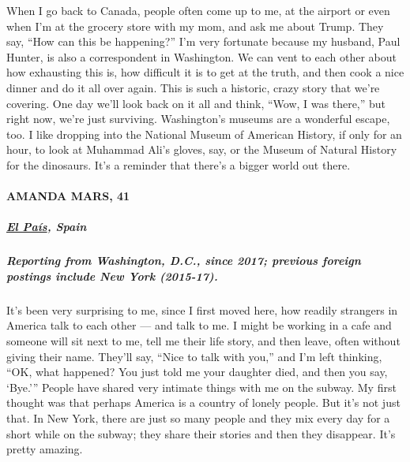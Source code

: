 When I go back to Canada, people often come up to me, at the airport or
even when I'm at the grocery store with my mom, and ask me about Trump.
They say, ``How can this be happening?'' I'm very fortunate because my
husband, Paul Hunter, is also a correspondent in Washington. We can vent
to each other about how exhausting this is, how difficult it is to get
at the truth, and then cook a nice dinner and do it all over again. This
is such a historic, crazy story that we're covering. One day we'll look
back on it all and think, ``Wow, I was there,'' but right now, we're
just surviving. Washington's museums are a wonderful escape, too. I like
dropping into the National Museum of American History, if only for an
hour, to look at Muhammad Ali's gloves, say, or the Museum of Natural
History for the dinosaurs. It's a reminder that there's a bigger world
out there.

\hypertarget{amanda-mars-41}{%
\paragraph{AMANDA MARS, 41}\label{amanda-mars-41}}

\hypertarget{el-pauxeds-spain}{%
\subparagraph{\texorpdfstring{\textbf{\href{https://elpais.com/america/}{El
País}, Spain}}{El País, Spain}}\label{el-pauxeds-spain}}

\hypertarget{reporting-from-washington-dc-since-2017-previous-foreign-postings-include-new-york-2015-17}{%
\subparagraph{\texorpdfstring{\textbf{Reporting from Washington, D.C.,
since 2017; previous foreign postings include New York
(2015-17).}}{Reporting from Washington, D.C., since 2017; previous foreign postings include New York (2015-17).}}\label{reporting-from-washington-dc-since-2017-previous-foreign-postings-include-new-york-2015-17}}

It's been very surprising to me, since I first moved here, how readily
strangers in America talk to each other --- and talk to me. I might be
working in a cafe and someone will sit next to me, tell me their life
story, and then leave, often without giving their name. They'll say,
``Nice to talk with you,'' and I'm left thinking, ``OK, what happened?
You just told me your daughter died, and then you say, `Bye.''' People
have shared very intimate things with me on the subway. My first thought
was that perhaps America is a country of lonely people. But it's not
just that. In New York, there are just so many people and they mix every
day for a short while on the subway; they share their stories and then
they disappear. It's pretty amazing.

